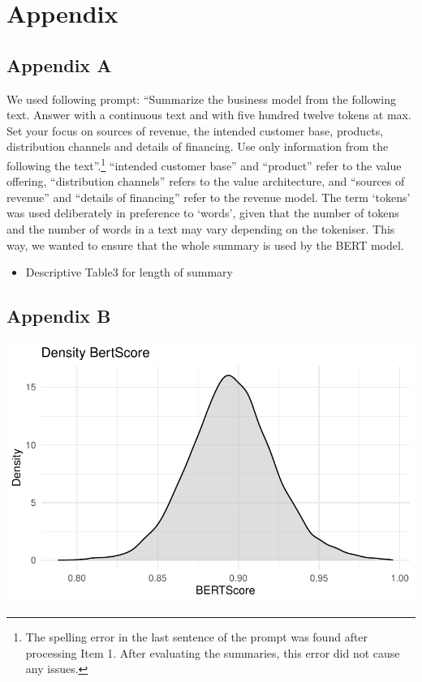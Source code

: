 \documentclass[
]{article}
\providecommand{\tightlist}{%
  \setlength{\itemsep}{0pt}\setlength{\parskip}{0pt}}\usepackage{longtable,booktabs,array}
\begin{document}
\newpage{}

\section{Appendix}\label{appendix}

\subsection{Appendix A}\label{appendix-a}

We used following prompt: ``Summarize the business model from the
following text. Answer with a continuous text and with five hundred
twelve tokens at max. Set your focus on sources of revenue, the intended
customer base, products, distribution channels and details of financing.
Use only information from the following the text''.\footnote{The
  spelling error in the last sentence of the prompt was found after
  processing Item 1. After evaluating the summaries, this error did not
  cause any issues.} ``intended customer base'' and ``product'' refer to
the value offering, ``distribution channels'' refers to the value
architecture, and ``sources of revenue'' and ``details of financing''
refer to the revenue model. The term `tokens' was used deliberately in
preference to `words', given that the number of tokens and the number of
words in a text may vary depending on the tokeniser. This way, we wanted
to ensure that the whole summary is used by the BERT model.

\begin{itemize}
\tightlist
\item
  Descriptive Table3 for length of summary
\end{itemize}

\subsection{Appendix B}\label{appendix-b}

\includegraphics{ProjectEcoDataScience_files/figure-pdf/unnamed-chunk-7-1.pdf}

\begin{figure}%
\end{figure}%
\end{document}

